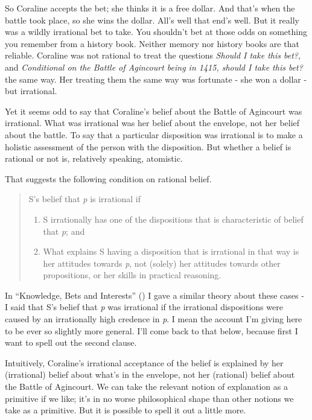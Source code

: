 \documentclass[
  12pt,
  letterpaper,
]{scrbook}
\providecommand{\tightlist}{%
  \setlength{\itemsep}{0pt}\setlength{\parskip}{0pt}}\usepackage{longtable,booktabs,array}
\begin{document}
So Coraline accepts the bet; she thinks it is a free dollar. And that's
when the battle took place, so she wins the dollar. All's well that
end's well. But it really was a wildly irrational bet to take. You
shouldn't bet at those odds on something you remember from a history
book. Neither memory nor history books are that reliable. Coraline was
not rational to treat the questions \emph{Should I take this bet?}, and
\emph{Conditional on the Battle of Agincourt being in 1415, should I
take this bet?} the same way. Her treating them the same way was
fortunate - she won a dollar - but irrational.

Yet it seems odd to say that Coraline's belief about the Battle of
Agincourt was irrational. What was irrational was her belief about the
envelope, not her belief about the battle. To say that a particular
disposition was irrational is to make a holistic assessment of the
person with the disposition. But whether a belief is rational or not is,
relatively speaking, atomistic.

That suggests the following condition on rational belief.

\begin{quote}
S's belief that \emph{p} is irrational if

\begin{enumerate}
\def\labelenumi{\arabic{enumi}.}
\tightlist
\item
  S irrationally has one of the dispositions that is characteristic of
  belief that \emph{p}; and
\item
  What explains S having a disposition that is irrational in that way is
  her attitudes towards \emph{p}, not (solely) her attitudes towards
  other propositions, or her skills in practical reasoning.
\end{enumerate}
\end{quote}

In ``Knowledge, Bets and Interests''
() I gave a similar
theory about these cases - I said that S's belief that \emph{p} was
irrational if the irrational dispositions were caused by an irrationally
high credence in \emph{p}. I mean the account I'm giving here to be ever
so slightly more general. I'll come back to that below, because first I
want to spell out the second clause.

Intuitively, Coraline's irrational acceptance of the belief is explained
by her (irrational) belief about what's in the envelope, not her
(rational) belief about the Battle of Agincourt. We can take the
relevant notion of explanation as a primitive if we like; it's in no
worse philosophical shape than other notions we take as a primitive. But
it is possible to spell it out a little more.
\end{document}
